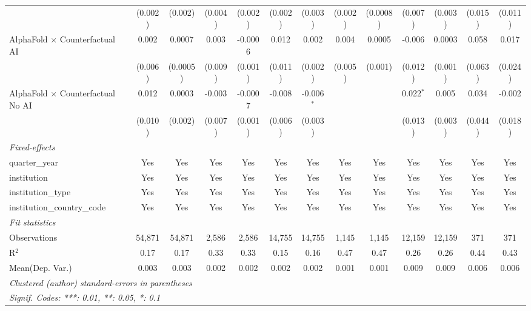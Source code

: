 \begin{tabular}{lcccccccccccc}
                                            & (0.002)  & (0.002)  & (0.004) & (0.002)  & (0.002)       & (0.003)      & (0.002) & (0.0008) & (0.007)     & (0.003)      & (0.015) & (0.011)\\   
   AlphaFold $\times$ Counterfactual AI     & 0.002    & 0.0007   & 0.003   & -0.0006  & 0.012         & 0.002        & 0.004   & 0.0005   & -0.006      & 0.0003       & 0.058   & 0.017\\   
                                            & (0.006)  & (0.0005) & (0.009) & (0.001)  & (0.011)       & (0.002)      & (0.005) & (0.001)  & (0.012)     & (0.001)      & (0.063) & (0.024)\\   
   AlphaFold $\times$ Counterfactual No AI  & 0.012    & 0.0003   & -0.003  & -0.0007  & -0.008        & -0.006$^{*}$ &         &          & 0.022$^{*}$ & 0.005        & 0.034   & -0.002\\   
                                            & (0.010)  & (0.002)  & (0.007) & (0.001)  & (0.006)       & (0.003)      &         &          & (0.013)     & (0.003)      & (0.044) & (0.018)\\   
   \midrule
   \emph{Fixed-effects}\\
   quarter\_year                            & Yes      & Yes      & Yes     & Yes      & Yes           & Yes          & Yes     & Yes      & Yes         & Yes          & Yes     & Yes\\  
   institution                              & Yes      & Yes      & Yes     & Yes      & Yes           & Yes          & Yes     & Yes      & Yes         & Yes          & Yes     & Yes\\  
   institution\_type                        & Yes      & Yes      & Yes     & Yes      & Yes           & Yes          & Yes     & Yes      & Yes         & Yes          & Yes     & Yes\\  
   institution\_country\_code               & Yes      & Yes      & Yes     & Yes      & Yes           & Yes          & Yes     & Yes      & Yes         & Yes          & Yes     & Yes\\  
   \midrule
   \emph{Fit statistics}\\
   Observations                             & 54,871   & 54,871   & 2,586   & 2,586    & 14,755        & 14,755       & 1,145   & 1,145    & 12,159      & 12,159       & 371     & 371\\  
   R$^2$                                    & 0.17     & 0.17     & 0.33    & 0.33     & 0.15          & 0.16         & 0.47    & 0.47     & 0.26        & 0.26         & 0.44    & 0.43\\  
Mean(Dep. Var.) & 0.003 & 0.003 & 0.002 & 0.002 & 0.002 & 0.002 & 0.001 & 0.001 & 0.009 & 0.009 & 0.006 & 0.006 \\
   \midrule \midrule
   \multicolumn{13}{l}{\emph{Clustered (author) standard-errors in parentheses}}\\
   \multicolumn{13}{l}{\emph{Signif. Codes: ***: 0.01, **: 0.05, *: 0.1}}\\
\end{tabular}
\par\endgroup
